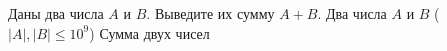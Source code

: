 Даны два числа $A$ и $B$. Выведите их сумму $A+B$.
\InputFile
Два числа $A$ и $B$ ($|A|,|B|\leq 10^9$)
\OutputFile
Сумма двух чисел


